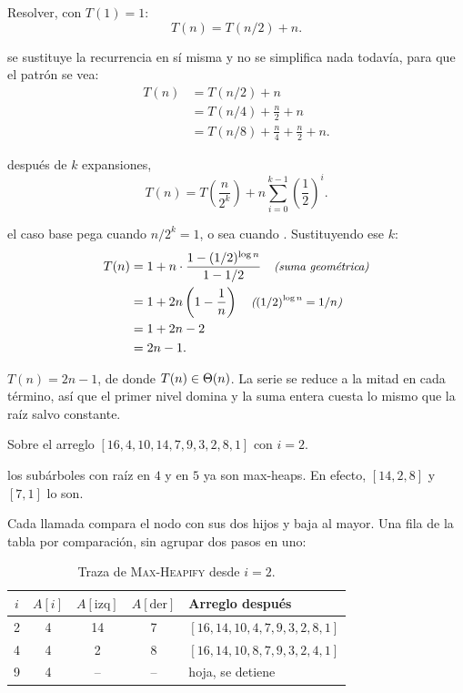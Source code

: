 \noindent Resolver, con $T(1) = 1$:
\[
  T(n) = T(n/2) + n.
\]

 se sustituye la recurrencia en sí misma y no se
simplifica nada todavía, para que el patrón se vea:
\begin{align*}
  T(n) &= T(n/2) + n \\
       &= T(n/4) + \frac{n}{2} + n \\
       &= T(n/8) + \frac{n}{4} + \frac{n}{2} + n.
\end{align*}

 después de $k$ expansiones,
\[
  T(n) = T\!\left(\frac{n}{2^k}\right)
         + n \sum_{i=0}^{k-1} \left(\frac{1}{2}\right)^{i}.
\]

 el caso base pega cuando $n/2^k = 1$, o sea
cuando . Sustituyendo ese $k$:
\begin{align*}
  T(n) &= 1 + n \cdot
          \frac{1 - (1/2)^{\log n}}{1 - 1/2} \quad\text{\small\itshape (suma geométrica)} \\
       &= 1 + 2n\left(1 - \frac{1}{n}\right)
          \quad\text{\small\itshape ($(1/2)^{\log n} = 1/n$)} \\
       &= 1 + 2n - 2 \\
       &= 2n - 1.
\end{align*}

\begin{resultado}
  $T(n) = 2n - 1$, de donde $T(n) \in \Theta\!\left(n\right)$. La serie se reduce a
  la mitad en cada término, así que el primer nivel domina y la suma
  entera cuesta lo mismo que la raíz salvo constante.
\end{resultado}



\noindent Sobre el arreglo $[16, 4, 10, 14, 7, 9, 3, 2, 8, 1]$ con
$i = 2$.

 los subárboles con raíz en $4$ y en $5$ ya son
max-heaps. En efecto, $[14, 2, 8]$ y $[7, 1]$ lo son.

Cada llamada compara el nodo con sus dos hijos y baja al mayor. Una
fila de la tabla por comparación, sin agrupar dos pasos en uno:

\begin{table}[H]
  \centering
  \begin{tabular}{ccccl}
    \toprule
    $i$ & $A[i]$ & $A[\mathrm{izq}]$ & $A[\mathrm{der}]$
        & \textbf{Arreglo después} \\
    \midrule
    2 & 4 & 14 & 7 & $[16, 14, 10, 4, 7, 9, 3, 2, 8, 1]$ \\
    4 & 4 & 2  & 8 & $[16, 14, 10, 8, 7, 9, 3, 2, 4, 1]$ \\
    9 & 4 & -- & -- & hoja, se detiene \\
    \bottomrule
  \end{tabular}
  \caption{Traza de \textsc{Max-Heapify} desde $i = 2$.}
  \label{tab:heapify}
\end{table}

